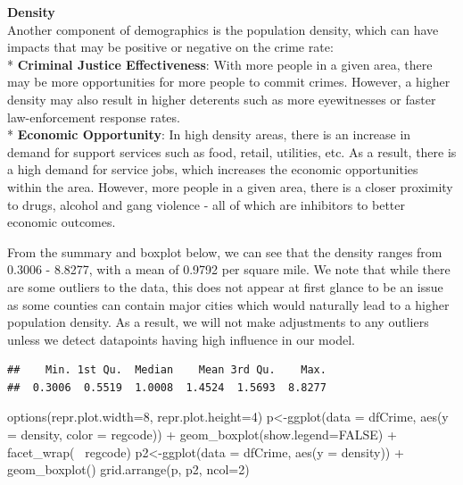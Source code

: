 \documentclass[]{article}
\newenvironment{Shaded}{}{}
\newcommand{\DataTypeTok}[1]{#1}
\newcommand{\DecValTok}[1]{#1}
\newcommand{\KeywordTok}[1]{\textcolor[rgb]{0.00,0.00,1.00}{#1}}
\newcommand{\NormalTok}[1]{#1}
\newcommand{\OperatorTok}[1]{#1}
\newcommand{\OtherTok}[1]{\textcolor[rgb]{1.00,0.25,0.00}{#1}}
\newcommand{\StringTok}[1]{\textcolor[rgb]{0.00,0.50,0.50}{#1}}
\begin{document}
\textbf{Density}\\
Another component of demographics is the population density, which can
have impacts that may be positive or negative on the crime rate:\\
* \textbf{Criminal Justice Effectiveness}: With more people in a given
area, there may be more opportunities for more people to commit crimes.
However, a higher density may also result in higher deterents such as
more eyewitnesses or faster law-enforcement response rates.\\
* \textbf{Economic Opportunity}: In high density areas, there is an
increase in demand for support services such as food, retail, utilities,
etc. As a result, there is a high demand for service jobs, which
increases the economic opportunities within the area. However, more
people in a given area, there is a closer proximity to drugs, alcohol
and gang violence - all of which are inhibitors to better economic
outcomes.

From the summary and boxplot below, we can see that the density ranges
from 0.3006 - 8.8277, with a mean of 0.9792 per square mile. We note
that while there are some outliers to the data, this does not appear at
first glance to be an issue as some counties can contain major cities
which would naturally lead to a higher population density. As a result,
we will not make adjustments to any outliers unless we detect datapoints
having high influence in our model.

\begin{Shaded}
\end{Shaded}

\begin{verbatim}
##    Min. 1st Qu.  Median    Mean 3rd Qu.    Max. 
##  0.3006  0.5519  1.0008  1.4524  1.5693  8.8277
\end{verbatim}

\begin{Shaded}
\begin{Highlighting}[]
\KeywordTok{options}\NormalTok{(}\DataTypeTok{repr.plot.width=}\DecValTok{8}\NormalTok{, }\DataTypeTok{repr.plot.height=}\DecValTok{4}\NormalTok{)}
\NormalTok{p<-}\KeywordTok{ggplot}\NormalTok{(}\DataTypeTok{data =}\NormalTok{ dfCrime, }\KeywordTok{aes}\NormalTok{(}\DataTypeTok{y =}\NormalTok{ density, }\DataTypeTok{color =}\NormalTok{ regcode)) }\OperatorTok{+}
\StringTok{     }\KeywordTok{geom_boxplot}\NormalTok{(}\DataTypeTok{show.legend=}\OtherTok{FALSE}\NormalTok{) }\OperatorTok{+}\StringTok{ }\KeywordTok{facet_wrap}\NormalTok{(}\OperatorTok{~}\StringTok{ }\NormalTok{regcode)}
\NormalTok{p2<-}\KeywordTok{ggplot}\NormalTok{(}\DataTypeTok{data =}\NormalTok{ dfCrime, }\KeywordTok{aes}\NormalTok{(}\DataTypeTok{y =}\NormalTok{ density)) }\OperatorTok{+}
\StringTok{     }\KeywordTok{geom_boxplot}\NormalTok{()}
\KeywordTok{grid.arrange}\NormalTok{(p, p2, }\DataTypeTok{ncol=}\DecValTok{2}\NormalTok{)}
\end{Highlighting}
\end{Shaded}
\end{document}
